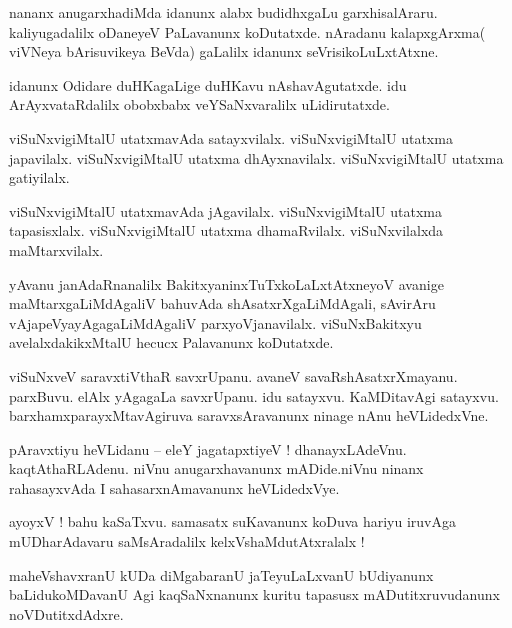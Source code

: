 \documentclass{article}
\begin{document}
\begin{mn}%
nananx anugarxhadiMda idanunx alabx budidhxgaLu garxhisalAraru. kaliyugadalilx oDaneyeV PaLavanunx 
koDutatxde. nAradanu kalapxgArxma( viVNeya bArisuvikeya BeVda) gaLalilx idanunx seVrisikoLuLxtAtxne.
\end{mn}

\begin{mn}%
idanunx Odidare duHKagaLige duHKavu nAshavAgutatxde. idu ArAyxvataRdalilx obobxbabx veYSaNxvaralilx 
uLidirutatxde.
\end{mn}

\begin{mn}%
viSuNxvigiMtalU utatxmavAda satayxvilalx. viSuNxvigiMtalU utatxma japavilalx. viSuNxvigiMtalU 
utatxma dhAyxnavilalx. viSuNxvigiMtalU utatxma gatiyilalx.
\end{mn}

\begin{mn}%
viSuNxvigiMtalU utatxmavAda jAgavilalx. viSuNxvigiMtalU utatxma tapasisxlalx. viSuNxvigiMtalU 
utatxma dhamaRvilalx. viSuNxvilalxda maMtarxvilalx.
\end{mn}

\begin{mn}%
yAvanu janAdaRnanalilx BakitxyaninxTuTxkoLaLxtAtxneyoV avanige maMtarxgaLiMdAgaliV bahuvAda 
shAsatxrXgaLiMdAgali, sAvirAru vAjapeVyayAgagaLiMdAgaliV parxyoVjanavilalx. viSuNxBakitxyu 
avelalxdakikxMtalU hecucx Palavanunx koDutatxde.
\end{mn}

\begin{mn}%
viSuNxveV saravxtiVthaR savxrUpanu. avaneV savaRshAsatxrXmayanu. parxBuvu. elAlx yAgagaLa 
savxrUpanu. idu satayxvu. KaMDitavAgi satayxvu. barxhamxparayxMtavAgiruva saravxsAravanunx ninage 
nAnu heVLidedxVne.
\end{mn}

\begin{mn}%
pAravxtiyu heVLidanu -- eleY jagatapxtiyeV ! dhanayxLAdeVnu. kaqtAthaRLAdenu. niVnu anugarxhavanunx 
mADide.niVnu ninanx rahasayxvAda I sahasarxnAmavanunx heVLidedxVye.
\end{mn}

\begin{mn}%
ayoyxV ! bahu kaSaTxvu. samasatx suKavanunx koDuva hariyu iruvAga mUDharAdavaru saMsAradalilx 
kelxVshaMdutAtxralalx ! 
\end{mn}

\begin{mn}%
maheVshavxranU kUDa diMgabaranU jaTeyuLaLxvanU bUdiyanunx baLidukoMDavanU Agi kaqSaNxnanunx kuritu 
tapasusx mADutitxruvudanunx noVDutitxdAdxre.
\end{mn}
\end{document}
